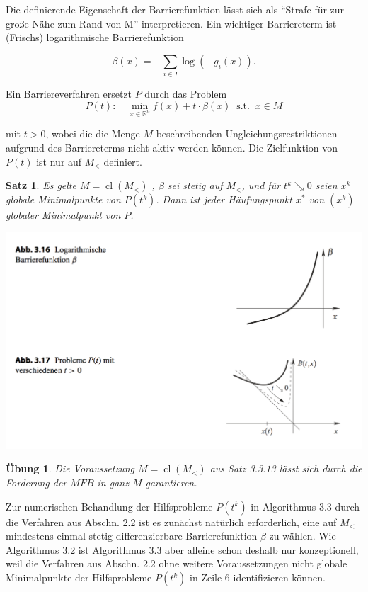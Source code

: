 \documentclass[11pt]{scrreprt}
\newcounter{thm}
\theoremstyle{thmstyle}
\numberwithin{thm}{section}
\newtheorem{satz}[thm]{Satz}
\newtheorem{uebung}[thm]{Übung}
\begin{document}
Die definierende Eigenschaft der Barrierefunktion lässt sich als \enquote{Strafe für zur große Nähe zum Rand von M} interpretieren. Ein wichtiger Barriereterm ist (Frischs) logarithmische Barrierefunktion

$$ \beta(x) = - \sum_{i \in I} \log(-g_i(x)). $$

Ein Barriereverfahren ersetzt $P$ durch das Problem
	$$ P(t): \quad \min_{x \in \mathbb{R}^n} f(x)+ t \cdot \beta (x) ~\text{ s.t. }~x \in M $$
	
	mit $t > 0$, wobei die die Menge $M$ beschreibenden Ungleichungsrestriktionen aufgrund des Barriereterms nicht aktiv werden können. Die Zielfunktion von $P(t)$ ist nur auf $M_<$ definiert.

\setcounter{thm}{12}

\begin{satz}
	Es gelte $M = \operatorname{cl}(M_<)$ , $\beta$ sei stetig auf $M_<$, und für $t^k \searrow 0$ seien $x^k$ globale Minimalpunkte von $P(t^k)$. Dann ist jeder Häufungspunkt $x^*$ von $(x^k)$ globaler Minimalpunkt von $P$.
\end{satz}

\begin{center}
	\includegraphics[scale=0.5]{img/ab316}
\end{center}

\begin{uebung}
	Die Voraussetzung $M = \operatorname{cl}(M_<)$ aus Satz 3.3.13 lässt sich durch die Forderung der $MFB$ in ganz $M$ garantieren.
\end{uebung}	
	
Zur numerischen Behandlung der Hilfsprobleme $P(t^k)$ in Algorithmus 3.3 durch die Verfahren aus Abschn. 2.2 ist es zunächst natürlich erforderlich, eine auf $M_<$ mindestens einmal stetig differenzierbare Barrierefunktion $\beta$ zu wählen. Wie Algorithmus 3.2 ist Algorithmus 3.3 aber alleine schon deshalb nur konzeptionell, weil die Verfahren aus Abschn. 2.2 ohne weitere Voraussetzungen nicht globale Minimalpunkte der Hilfsprobleme $P(t^k)$ in Zeile 6 identifizieren können.	
	
\end{document}
